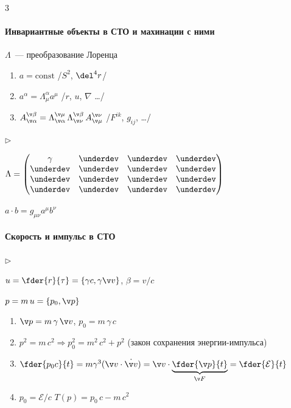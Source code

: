 \documentclass{trchesh}
\newenvironment{facts}{\begin{list}{$\triangleright$}{}}{\end{list}}
\begin{document}
\begin{multicols*}{3}
\paragraph{Инвариантные объекты в СТО и махинации с ними\underdev}
$\Lambda$~--- преобразование Лоренца
\begin{enumerate}
  \item $a = \mathrm{const}$ \hfill /$S^2$, $\del^4r$/
  \item $a^\alpha = \Lambda^\alpha_\mu a^\mu$ \hfill /$r$, $u$, $\nabla$ \dots/
  \item $A_{\v \alpha}^{\v \beta} = \Lambda_{\v \alpha}^{\v \mu} \, \Lambda_{\v \nu}^{\v \beta}\,
    A_{\v \mu}^{\v \nu}$ \hfill /$F^{ik}$, $g_{ij}$, \dots/
\end{enumerate}

\begin{facts}
\item $\Lambda = \begin{pmatrix}
  \gamma &  \underdev & \underdev&\underdev \\
  \underdev &  \underdev & \underdev&\underdev \\
  \underdev &  \underdev & \underdev&\underdev \\
  \underdev &  \underdev & \underdev&\underdev
\end{pmatrix}$
\item $a \cdot b = g_{\mu\nu} a^\mu b^\nu$
\end{facts}

\paragraph{Скорость и импульс в СТО}

\begin{facts}
  \item $u = \fder{r}{\tau}  = \{\gamma c, \gamma \v v\}$, $\beta = v / c$
  \item $p = m \, u = \{p_0, \v p\}$
\end{facts}
\begin{enumerate}
\item $\v p = m \, \gamma \, \v v$, $p_0 = m \, \gamma \, c$
\item $p^2 = m\, c^2 \Rightarrow p_0^2 = m^2\,c^2 + p^2$ (закон сохранения энергии-импульса)
\item $\fder{p_0 c}{t} = m \gamma^3 (\v v \cdot \dot{\v v}) = 
  \v v \cdot \underbrace{\fder{\v p}{t}}_{\v F} = \fder{\mathcal E}{t}$
\item $p_0 = \mathcal E/c$  $T(p) = p_0\, c - m\,c^2$
\end{enumerate}


\end{multicols*}
\end{document}
